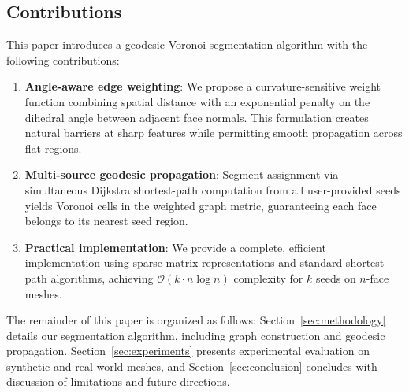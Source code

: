\subsection{Contributions}

This paper introduces a geodesic Voronoi segmentation algorithm with the following contributions:

\begin{enumerate}
    \item \textbf{Angle-aware edge weighting}: We propose a curvature-sensitive weight function combining spatial distance with an exponential penalty on the dihedral angle between adjacent face normals. This formulation creates natural barriers at sharp features while permitting smooth propagation across flat regions.
    
    \item \textbf{Multi-source geodesic propagation}: Segment assignment via simultaneous Dijkstra shortest-path computation from all user-provided seeds yields Voronoi cells in the weighted graph metric, guaranteeing each face belongs to its nearest seed region.
    
    \item \textbf{Practical implementation}: We provide a complete, efficient implementation using sparse matrix representations and standard shortest-path algorithms, achieving $\mathcal{O}(k \cdot n \log n)$ complexity for $k$ seeds on $n$-face meshes.
\end{enumerate}

The remainder of this paper is organized as follows: Section~\ref{sec:methodology} details our segmentation algorithm, including graph construction and geodesic propagation. Section~\ref{sec:experiments} presents experimental evaluation on synthetic and real-world meshes, and Section~\ref{sec:conclusion} concludes with discussion of limitations and future directions.
